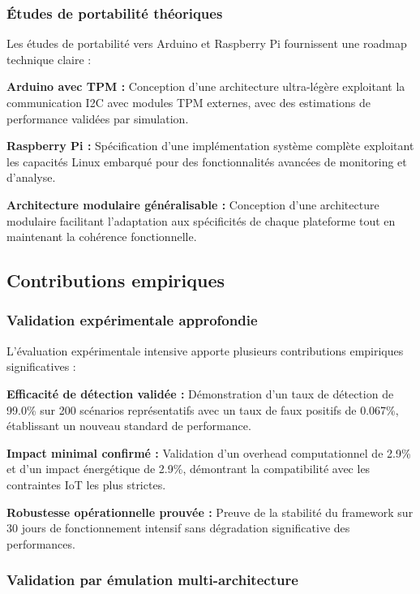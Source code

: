 \subsubsection{Études de portabilité théoriques}

Les études de portabilité vers Arduino et Raspberry Pi fournissent une roadmap technique claire :

\textbf{Arduino avec TPM :} Conception d'une architecture ultra-légère exploitant la communication I2C avec modules TPM externes, avec des estimations de performance validées par simulation.

\textbf{Raspberry Pi :} Spécification d'une implémentation système complète exploitant les capacités Linux embarqué pour des fonctionnalités avancées de monitoring et d'analyse.

\textbf{Architecture modulaire généralisable :} Conception d'une architecture modulaire facilitant l'adaptation aux spécificités de chaque plateforme tout en maintenant la cohérence fonctionnelle.

\subsection{Contributions empiriques}

\subsubsection{Validation expérimentale approfondie}

L'évaluation expérimentale intensive apporte plusieurs contributions empiriques significatives :

\textbf{Efficacité de détection validée :} Démonstration d'un taux de détection de 99.0\% sur 200 scénarios représentatifs avec un taux de faux positifs de 0.067\%, établissant un nouveau standard de performance.

\textbf{Impact minimal confirmé :} Validation d'un overhead computationnel de 2.9\% et d'un impact énergétique de 2.9\%, démontrant la compatibilité avec les contraintes IoT les plus strictes.

\textbf{Robustesse opérationnelle prouvée :} Preuve de la stabilité du framework sur 30 jours de fonctionnement intensif sans dégradation significative des performances.

\subsubsection{Validation par émulation multi-architecture}

